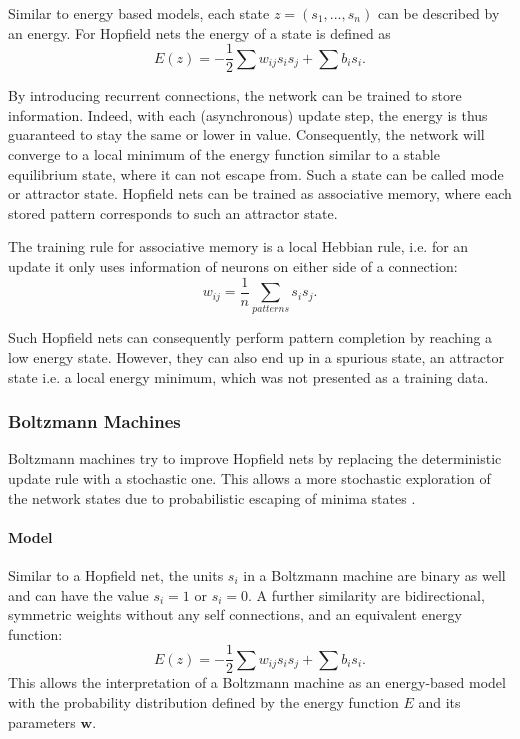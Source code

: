 Similar to energy based models, each state $z = (s_1, ... , s_n)$ can be described by an energy. 
For Hopfield nets the energy of a state is defined as  
\[
E(z) = - \frac{1}{2} \sum w_{ij} s_i s_j + \sum b_i s_i .
\]


By introducing recurrent connections, the network can be trained to store information.
Indeed, with each (asynchronous) update step, the energy is thus guaranteed to stay the same or lower in value.
Consequently, the network will converge to a local minimum of the energy function similar to a stable equilibrium state, where it can not escape from. 
Such a state can be called mode or attractor state.
Hopfield nets can be trained as associative memory, where each stored pattern corresponds to such an attractor state.

The training rule for associative memory is a local Hebbian rule, i.e. for an update it only uses information of neurons on either side of a connection:
\[
w_{ij} = \frac{1}{n} \sum_{patterns} s_{i} s_{j} .
\]

Such Hopfield nets can consequently perform pattern completion by reaching a low energy state.
However, they can also end up in a spurious state, an attractor state i.e. a local energy minimum, which was not presented as a training data.


\subsubsection{Boltzmann Machines} \label{c:bms}

Boltzmann machines try to improve Hopfield nets by replacing the deterministic update rule with a stochastic one.
This allows a more stochastic exploration of the network states due to probabilistic escaping of minima states \cite{ackley1985learning, Goodfellow-et-al-2016-Book}.

\paragraph{Model} \label{c:bmmodel}

Similar to a Hopfield net, the units $s_i$ in a Boltzmann machine are binary as well and can have the value $s_i = 1$ or $s_i = 0$. 
A further similarity are bidirectional, symmetric weights without any self connections, and an equivalent energy function:
\[
	E(z) = - \frac{1}{2} \sum w_{ij} s_i s_j + \sum b_i s_i .
\]
This allows the interpretation of a Boltzmann machine as an energy-based model with the probability distribution defined by the energy function $E$ and its parameters $\textbf{w}$.

